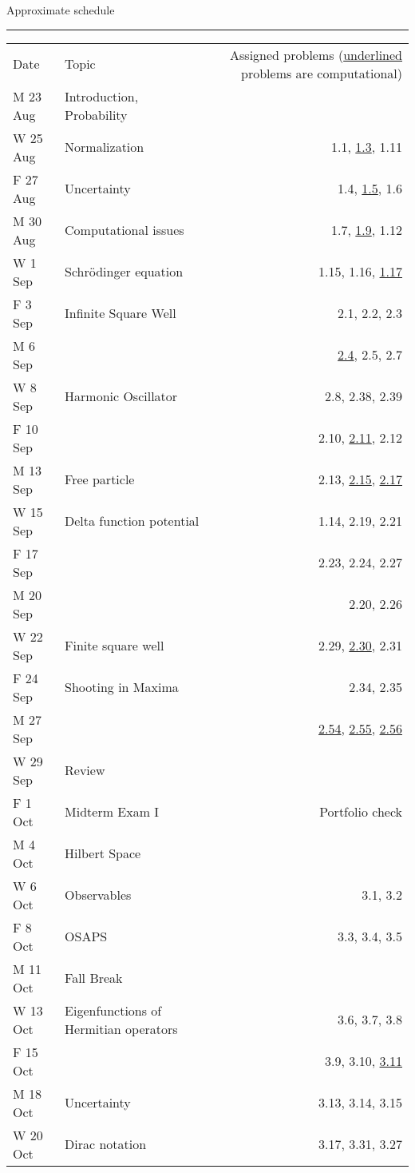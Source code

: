 \documentclass{article}
\begin{document}
\hspace*{-1cm}\begin{minipage}{\textwidth}
\centerline{Approximate schedule}
\vskip0.1cm\hrule\vskip0.5cm
  \begin{tabular}{llr}
    Date & Topic & Assigned problems ({\underline{underlined}} problems are computational)\\[0.5ex]
M 23 Aug& Introduction, Probability & \\
W 25 Aug& Normalization & 1.1, {\underline{1.3}}, 1.11\\
F 27 Aug& Uncertainty & 1.4, {\underline{1.5}}, 1.6\\
M 30 Aug& Computational issues & 1.7, {\underline{1.9}}, 1.12\\
W  1 Sep& Schr\"odinger equation & 1.15, 1.16, {\underline{1.17}}\\
F  3 Sep& Infinite Square Well & 2.1, 2.2, 2.3\\
M  6 Sep&  & {\underline{2.4}}, 2.5, 2.7\\
W  8 Sep& Harmonic Oscillator & 2.8, 2.38, 2.39\\
F 10 Sep& & 2.10, {\underline{2.11}}, 2.12\\
M 13 Sep& Free particle & 2.13, {\underline{2.15}}, {\underline{2.17}}\\
W 15 Sep& Delta function potential & 1.14, 2.19, 2.21\\
F 17 Sep& & 2.23, 2.24, 2.27\\
M 20 Sep&  & 2.20, 2.26\\
W 22 Sep& Finite square well & 2.29, {\underline{2.30}}, 2.31\\
F 24 Sep& Shooting in Maxima & 2.34, 2.35\\
M 27 Sep&  & {\underline{2.54}}, {\underline{2.55}}, {\underline{2.56}}\\
W 29 Sep& Review & \\
F  1 Oct& Midterm Exam I& Portfolio check\\
M  4 Oct& Hilbert Space & \\
W  6 Oct& Observables & 3.1, 3.2\\
F  8 Oct& OSAPS & 3.3, 3.4, 3.5\\
M 11 Oct& Fall Break & \\
W 13 Oct& Eigenfunctions of Hermitian operators & 3.6, 3.7, 3.8\\
F 15 Oct&  & 3.9, 3.10, {\underline{3.11}}\\
M 18 Oct& Uncertainty & 3.13, 3.14, 3.15\\
W 20 Oct& Dirac notation & 3.17, 3.31, 3.27\\

\end{tabular}
\end{minipage}
\end{document}
